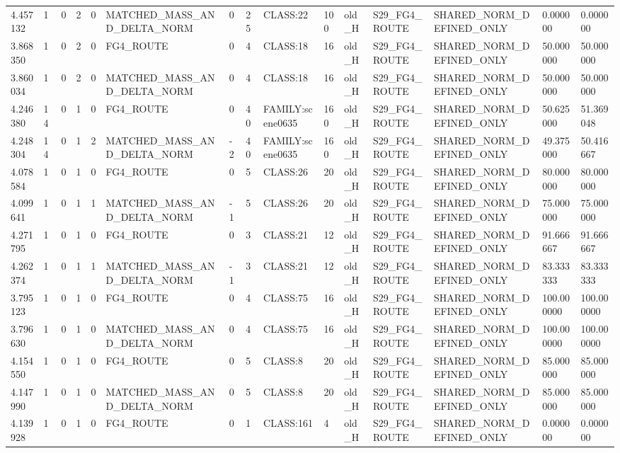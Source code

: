 \begin{tabular}{lllllllllllllll}
4.457132 & 1 & 0 & 2 & 0 & MATCHED\_MASS\_AND\_DELTA\_NORM & 0 & 25 & CLASS:22 & 100 & old\_H & S29\_FG4\_ROUTE & SHARED\_NORM\_DEFINED\_ONLY & 0.000000 & 0.000000 \\
3.868350 & 1 & 0 & 2 & 0 & FG4\_ROUTE & 0 & 4 & CLASS:18 & 16 & old\_H & S29\_FG4\_ROUTE & SHARED\_NORM\_DEFINED\_ONLY & 50.000000 & 50.000000 \\
3.860034 & 1 & 0 & 2 & 0 & MATCHED\_MASS\_AND\_DELTA\_NORM & 0 & 4 & CLASS:18 & 16 & old\_H & S29\_FG4\_ROUTE & SHARED\_NORM\_DEFINED\_ONLY & 50.000000 & 50.000000 \\
4.246380 & 14 & 0 & 1 & 0 & FG4\_ROUTE & 0 & 40 & FAMILY:scene0635 & 160 & old\_H & S29\_FG4\_ROUTE & SHARED\_NORM\_DEFINED\_ONLY & 50.625000 & 51.369048 \\
4.248304 & 14 & 0 & 1 & 2 & MATCHED\_MASS\_AND\_DELTA\_NORM & -2 & 40 & FAMILY:scene0635 & 160 & old\_H & S29\_FG4\_ROUTE & SHARED\_NORM\_DEFINED\_ONLY & 49.375000 & 50.416667 \\
4.078584 & 1 & 0 & 1 & 0 & FG4\_ROUTE & 0 & 5 & CLASS:26 & 20 & old\_H & S29\_FG4\_ROUTE & SHARED\_NORM\_DEFINED\_ONLY & 80.000000 & 80.000000 \\
4.099641 & 1 & 0 & 1 & 1 & MATCHED\_MASS\_AND\_DELTA\_NORM & -1 & 5 & CLASS:26 & 20 & old\_H & S29\_FG4\_ROUTE & SHARED\_NORM\_DEFINED\_ONLY & 75.000000 & 75.000000 \\
4.271795 & 1 & 0 & 1 & 0 & FG4\_ROUTE & 0 & 3 & CLASS:21 & 12 & old\_H & S29\_FG4\_ROUTE & SHARED\_NORM\_DEFINED\_ONLY & 91.666667 & 91.666667 \\
4.262374 & 1 & 0 & 1 & 1 & MATCHED\_MASS\_AND\_DELTA\_NORM & -1 & 3 & CLASS:21 & 12 & old\_H & S29\_FG4\_ROUTE & SHARED\_NORM\_DEFINED\_ONLY & 83.333333 & 83.333333 \\
3.795123 & 1 & 0 & 1 & 0 & FG4\_ROUTE & 0 & 4 & CLASS:75 & 16 & old\_H & S29\_FG4\_ROUTE & SHARED\_NORM\_DEFINED\_ONLY & 100.000000 & 100.000000 \\
3.796630 & 1 & 0 & 1 & 0 & MATCHED\_MASS\_AND\_DELTA\_NORM & 0 & 4 & CLASS:75 & 16 & old\_H & S29\_FG4\_ROUTE & SHARED\_NORM\_DEFINED\_ONLY & 100.000000 & 100.000000 \\
4.154550 & 1 & 0 & 1 & 0 & FG4\_ROUTE & 0 & 5 & CLASS:8 & 20 & old\_H & S29\_FG4\_ROUTE & SHARED\_NORM\_DEFINED\_ONLY & 85.000000 & 85.000000 \\
4.147990 & 1 & 0 & 1 & 0 & MATCHED\_MASS\_AND\_DELTA\_NORM & 0 & 5 & CLASS:8 & 20 & old\_H & S29\_FG4\_ROUTE & SHARED\_NORM\_DEFINED\_ONLY & 85.000000 & 85.000000 \\
4.139928 & 1 & 0 & 1 & 0 & FG4\_ROUTE & 0 & 1 & CLASS:161 & 4 & old\_H & S29\_FG4\_ROUTE & SHARED\_NORM\_DEFINED\_ONLY & 0.000000 & 0.000000 \\

\end{tabular}
